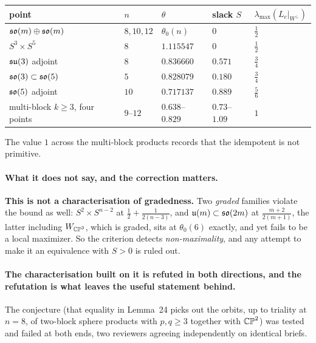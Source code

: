 \begin{center}
\begin{tabular}{@{}lllll@{}}
\toprule
point & $n$ & $\theta$ & slack $S$ & $\lambda_{\max}(L_e|_{W^\perp})$ \\
\midrule
$\mathfrak{so}(m)\oplus\mathfrak{so}(m)$ & $8,10,12$ & $\theta_0(n)$ & $0$ & $\tfrac12$ \\
$S^3\times S^5$ & $8$ & $1.115547$ & $0$ & $\tfrac12$ \\
$\mathfrak{su}(3)$ adjoint & $8$ & $0.836660$ & $0.571$ & $\tfrac34$ \\
$\mathfrak{so}(3)\subset\mathfrak{so}(5)$ & $5$ & $0.828079$ & $0.180$ & $\tfrac34$ \\
$\mathfrak{so}(5)$ adjoint & $10$ & $0.717137$ & $0.889$ & $\tfrac56$ \\
multi-block $k\ge3$, four points & $9$--$12$ & $0.638$--$0.829$ & $0.73$--$1.09$ & $1$ \\
\bottomrule
\end{tabular}
\end{center}

The value $1$ across the multi-block products records that the idempotent is not primitive.

\paragraph{What it does not say, and the correction matters.} \textbf{This is not a characterisation of gradedness.} Two \emph{graded} families violate the bound as well: $S^2\times S^{n-2}$ at $\tfrac12+\tfrac1{2(n-3)}$, and $\mathfrak{u}(m)\subset\mathfrak{so}(2m)$ at $\tfrac{m+2}{2(m+1)}$, the latter including $W_{\mathbb{CP}^3}$, which is graded, sits at $\theta_0(6)$ exactly, and yet fails to be a local maximizer. So the criterion detects \emph{non-maximality}, and any attempt to make it an equivalence with $S>0$ is ruled out.

\paragraph{The characterisation built on it is refuted in both directions, and the refutation is what leaves the useful statement behind.} The conjecture (that equality in Lemma~24 picks out the orbits, up to triality at $n=8$, of two-block sphere products with $p,q\ge3$ together with $\mathbb{CP}^2$) was tested and failed at both ends, two reviewers agreeing independently on identical briefs.

